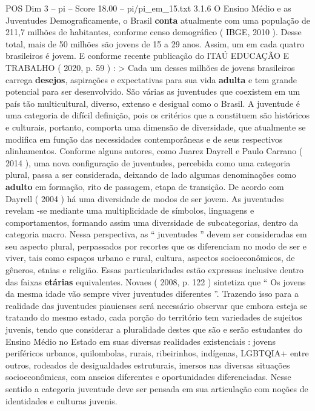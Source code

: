\begin{textsample}{POS Dim 3 – pi – Score 18.00 – pi/pi\_em\_15.txt}  \label{ex:f3_pos_253}
3.1.6 O Ensino Médio e as Juventudes Demograficamente, o Brasil \textbf{conta} atualmente com uma população de 211,7 milhões de habitantes, conforme censo demográfico ( IBGE, 2010 ).
Desse total, mais de 50 milhões são jovens de 15 a 29 anos.
Assim, um em cada quatro brasileiros é jovem.
E conforme recente publicação do ITAÚ EDUCAÇÃO E TRABALHO ( 2020, p. 59 ) : > Cada um desses milhões de jovens brasileiros carrega \textbf{desejos}, aspirações e expectativas para sua vida \textbf{adulta} e tem grande potencial para ser desenvolvido.
São várias as juventudes que coexistem em um país tão multicultural, diverso, extenso e desigual como o Brasil.
A juventude é uma categoria de difícil definição, pois os critérios que a constituem são históricos e culturais, portanto, comporta uma dimensão de diversidade, que atualmente se modifica em função das necessidades contemporâneas e de seus respectivos alinhamentos.
Conforme alguns autores, como Juarez Dayrell e Paulo Carrano ( 2014 ), uma nova configuração de juventudes, percebida como uma categoria plural, passa a ser considerada, deixando de lado algumas denominações como \textbf{adulto} em formação, rito de passagem, etapa de transição.
De acordo com Dayrell ( 2004 ) há uma diversidade de modos de ser jovem.
As juventudes revelam -se mediante uma multiplicidade de símbolos, linguagens e comportamentos, formando assim uma diversidade de subcategorias, dentro da categoria macro.
Nessa perspectiva, as “ juventudes ” devem ser consideradas em seu aspecto plural, perpassados por recortes que os diferenciam no modo de ser e viver, tais como espaços urbano e rural, cultura, aspectos socioeconômicos, de gêneros, etnias e religião.
Essas particularidades estão expressas inclusive dentro das faixas \textbf{etárias} equivalentes.
Novaes ( 2008, p. 122 ) sintetiza que “ Os jovens da mesma idade vão sempre viver juventudes diferentes ”.
Trazendo isso para a realidade das juventudes piauienses será necessário observar que embora esteja se tratando do mesmo estado, cada porção do território tem variedades de sujeitos juvenis, tendo que considerar a pluralidade destes que são e serão estudantes do Ensino Médio no Estado em suas diversas realidades existenciais : jovens periféricos urbanos, quilombolas, rurais, ribeirinhos, indígenas, LGBTQIA+ entre outros, rodeados de desigualdades estruturais, imersos nas diversas situações socioeconômicas, com anseios diferentes e oportunidades diferenciadas.
Nesse sentido a categoria juventude deve ser pensada em sua articulação com noções de identidades e culturas juvenis.

\end{textsample}
